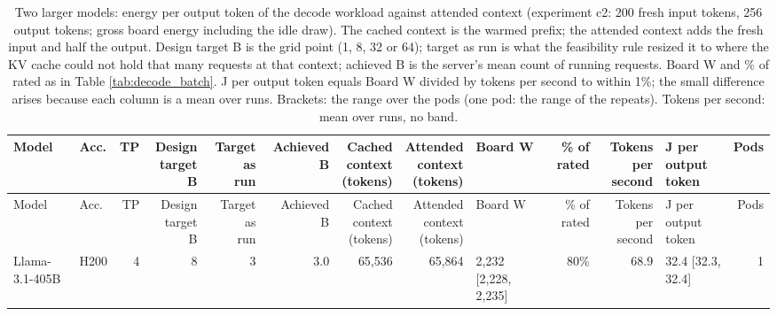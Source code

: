 \begin{landscape}
\begingroup
\scriptsize
\setlength{\tabcolsep}{3pt}
\begin{longtable}{llrrrrrrlrrlr}
\caption{Two larger models: energy per output token of the decode workload against attended context (experiment c2: 200 fresh input tokens, 256 output tokens; gross board energy including the idle draw). The cached context is the warmed prefix; the attended context adds the fresh input and half the output. Design target B is the grid point (1, 8, 32 or 64); target as run is what the feasibility rule resized it to where the KV cache could not hold that many requests at that context; achieved B is the server's mean count of running requests. Board W and \% of rated as in Table \ref{tab:decode_batch}. J per output token equals Board W divided by tokens per second to within 1\%; the small difference arises because each column is a mean over runs. Brackets: the range over the pods (one pod: the range of the repeats). Tokens per second: mean over runs, no band.}\label{tab:size_decode_context}\\
\toprule
Model & Acc. & TP & \makecell[r]{Design\\target B} & \makecell[r]{Target as\\run} & Achieved B & \makecell[r]{Cached\\context\\(tokens)} & \makecell[r]{Attended\\context\\(tokens)} & Board W & \% of rated & \makecell[r]{Tokens per\\second} & \makecell[l]{J per output\\token} & Pods \\
\midrule
\endfirsthead
\toprule
Model & Acc. & TP & \makecell[r]{Design\\target B} & \makecell[r]{Target as\\run} & Achieved B & \makecell[r]{Cached\\context\\(tokens)} & \makecell[r]{Attended\\context\\(tokens)} & Board W & \% of rated & \makecell[r]{Tokens per\\second} & \makecell[l]{J per output\\token} & Pods \\
\midrule
\endhead
\bottomrule
\endfoot
Llama-3.1-405B & H200 & 4 & 8 & 3 & 3.0 & 65,536 & 65,864 & 2,232 {[}2,228, 2,235{]} & 80\% & 68.9 & 32.4 {[}32.3, 32.4{]} & 1 \\

\end{longtable}
\end{landscape}
